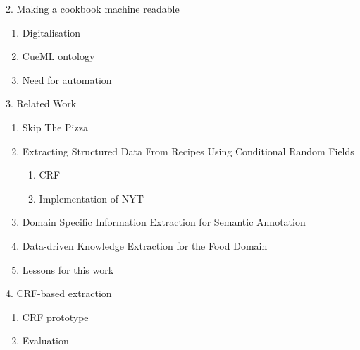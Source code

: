 \documentclass[12pt]{beamer}
\begin{document}
\begin{frame}{2. Making a cookbook machine readable}
	\begin{enumerate}
		\item Digitalisation
		\item CueML ontology
		\item Need for automation
	\end{enumerate}
\end{frame}

\begin{frame}{3. Related Work}
	\begin{enumerate}
		\item Skip The Pizza
		\item Extracting Structured Data From Recipes Using Conditional Random
		Fields
		\begin{enumerate}
			\item CRF
			\item Implementation of NYT
		\end{enumerate}
		\item Domain Specific Information Extraction for Semantic Annotation
		\item Data-driven Knowledge Extraction for the Food Domain
		\item Lessons for this work
	\end{enumerate}
\end{frame}

\begin{frame}{4. CRF-based extraction}
	\begin{enumerate}
		\item CRF prototype
		\item Evaluation
	\end{enumerate}
\end{frame}
\end{document}
